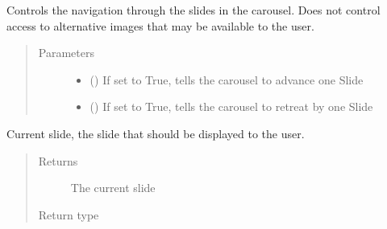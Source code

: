 \documentclass[letterpaper,10pt,english]{sphinxmanual}
\begin{document}
\begin{fulllineitems}
\begin{fulllineitems}
\label{\detokenize{polo.widgets:polo.widgets.slideshow_viewer.Carousel.controls}}
Controls the navigation through the slides
in the carousel. Does not control access to alternative
images that may be available to the user.
\begin{quote}\begin{description}
\item[{Parameters}] \leavevmode\begin{itemize}
\item {} 
 () \textendash{} If set to True, tells the carousel to
advance one Slide

\item {} 
 () \textendash{} If set to True, tells the carousel to
retreat by one Slide

\end{itemize}

\end{description}\end{quote}

\end{fulllineitems}


\begin{fulllineitems}
\label{\detokenize{polo.widgets:polo.widgets.slideshow_viewer.Carousel.current_slide}}
Current slide, the slide that should be displayed to the user.
\begin{quote}\begin{description}
\item[{Returns}] \leavevmode
The current slide

\item[{Return type}] \leavevmode
{\hyperref[\detokenize{polo.widgets:polo.widgets.slideshow_viewer.Slide}]{}}

\end{description}\end{quote}

\end{fulllineitems}


\end{fulllineitems}
\end{document}
